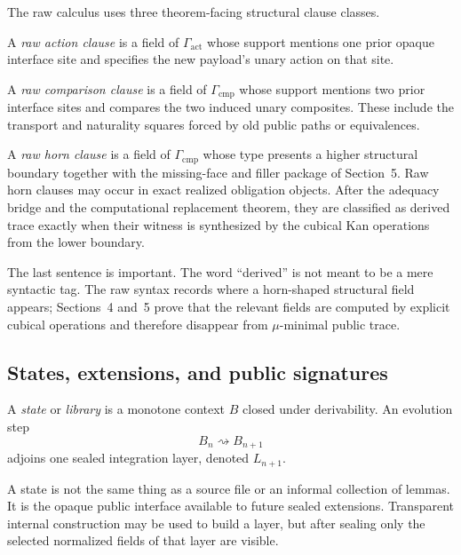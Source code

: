 \begin{definition}
The raw calculus uses three theorem-facing structural clause classes.

A \emph{raw action clause} is a field of \(\Gamma_{\mathrm{act}}\) whose support mentions one
prior opaque interface site and specifies the new payload's unary action on that site.

A \emph{raw comparison clause} is a field of \(\Gamma_{\mathrm{cmp}}\) whose support mentions
two prior interface sites and compares the two induced unary composites.  These include the
transport and naturality squares forced by old public paths or equivalences.

A \emph{raw horn clause} is a field of \(\Gamma_{\mathrm{cmp}}\) whose type presents a higher
structural boundary together with the missing-face and filler package of Section~5.  Raw horn
clauses may occur in exact realized obligation objects.  After the adequacy bridge and the
computational replacement theorem, they are classified as derived trace exactly when their
witness is synthesized by the cubical Kan operations from the lower boundary.
\end{definition}

The last sentence is important.  The word ``derived'' is not meant to be a mere syntactic tag.
The raw syntax records where a horn-shaped structural field appears; Sections~4 and~5 prove
that the relevant fields are computed by explicit cubical operations and therefore disappear
from \(\mu\)-minimal public trace.

\subsection{States, extensions, and public signatures}

\begin{definition}[State]
A \emph{state} or \emph{library} is a monotone context \(B\) closed under derivability.  An
evolution step
\[
  B_n \rightsquigarrow B_{n+1}
\]
adjoins one sealed integration layer, denoted \(L_{n+1}\).
\end{definition}

A state is not the same thing as a source file or an informal collection of lemmas.  It is the
opaque public interface available to future sealed extensions.  Transparent internal
construction may be used to build a layer, but after sealing only the selected normalized
fields of that layer are visible.

